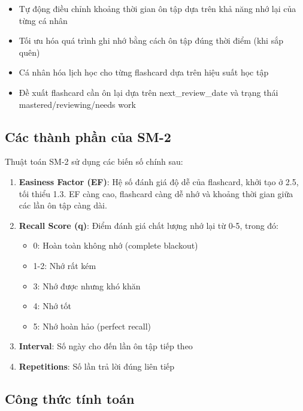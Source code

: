 \documentclass[../DoAn.tex]{subfiles}
\begin{document}
\begin{itemize}
    \item Tự động điều chỉnh khoảng thời gian ôn tập dựa trên khả năng nhớ lại của từng cá nhân
    \item Tối ưu hóa quá trình ghi nhớ bằng cách ôn tập đúng thời điểm (khi sắp quên)
    \item Cá nhân hóa lịch học cho từng flashcard dựa trên hiệu suất học tập
    \item Đề xuất flashcard cần ôn lại dựa trên next\_review\_date và trạng thái mastered/reviewing/needs work
\end{itemize}

\subsection{Các thành phần của SM-2}

Thuật toán SM-2 sử dụng các biến số chính sau:

\begin{enumerate}
    \item \textbf{Easiness Factor (EF)}: Hệ số đánh giá độ dễ của flashcard, khởi tạo ở 2.5, tối thiểu 1.3. EF càng cao, flashcard càng dễ nhớ và khoảng thời gian giữa các lần ôn tập càng dài.
    
    \item \textbf{Recall Score (q)}: Điểm đánh giá chất lượng nhớ lại từ 0-5, trong đó:
    \begin{itemize}
        \item 0: Hoàn toàn không nhớ (complete blackout)
        \item 1-2: Nhớ rất kém
        \item 3: Nhớ được nhưng khó khăn
        \item 4: Nhớ tốt
        \item 5: Nhớ hoàn hảo (perfect recall)
    \end{itemize}
    
    \item \textbf{Interval}: Số ngày cho đến lần ôn tập tiếp theo
    
    \item \textbf{Repetitions}: Số lần trả lời đúng liên tiếp
\end{enumerate}

\subsection{Công thức tính toán}
\end{document}
